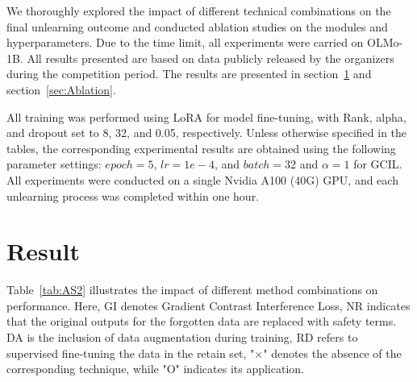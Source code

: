 \documentclass[11pt]{article}
\begin{document}

We thoroughly explored the impact of different technical combinations on the final unlearning outcome and conducted ablation studies on the modules and hyperparameters. Due to the time limit, all experiments were carried on OLMo-1B. All results presented are based on data publicly released by the organizers during the competition period. The results are presented in section~\ref{sec:Result} and section~\ref{sec:Ablation}.

All training was performed using LoRA \cite{hu2022lora} for model fine-tuning, with Rank, alpha, and dropout set to 8, 32, and 0.05, respectively. Unless otherwise specified in the tables, the corresponding experimental results are obtained using the following parameter settings: $epoch=5$, $lr=1e-4$, and $batch=32$ and $\alpha=1$ for GCIL. All experiments were conducted on a single Nvidia A100 (40G) GPU, and each unlearning process was completed within one hour.

\section{Result}
\label{sec:Result}



Table~\ref{tab:AS2} illustrates the impact of different method combinations on performance. Here, GI denotes Gradient Contrast Interference Loss, NR indicates that the original outputs for the forgotten data are replaced with safety terms. DA is the inclusion of data augmentation during training, RD refers to supervised fine-tuning the data in the retain set,
"×" denotes the absence of the corresponding technique, while "O" indicates its application.
\end{document}
